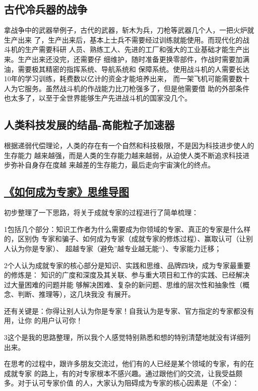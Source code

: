 \documentclass[11pt]{ctexart}
\begin{document}
{{{{\subsection{古代冷兵器的战争}
\label{sec:org8cf4dc8}
拿战争中的武器举例子，古代的武器，斩木为兵，刀枪等武器几个人，一把火炉就生产出来
了，生产出来后，基本上士兵不需要经过训练就能使用。而现代化的战斗机的生产需要科研
人员、熟练工人、先进的工厂和强大的工业基础才能生产出来。生产出来还没完，还需要仔
细维护，随时准备更换零部件，作战时需要加满油，需要极其精密的指挥系统、导航系统和
保障系统。使用战斗机的人需要长达10年的学习训练，耗费数以亿计的资金才能培养出来，
而一架飞机可能需要数十人为它服务。虽然战斗机的作战能力比刀枪强多了，但是他需要借
助的外部条件也太多了，以至于全世界能够生产先进战斗机的国家没几个。

\subsection{人类科技发展的结晶-高能粒子加速器}
\label{sec:org35abfa5}

根据递弱代偿理论，人类的存在有一个自然和科技极限，不是因为科技进步使人的生存能力
越来越强，而是人类的生存能力越来越弱，从迫使人类不断追求科技进步弥补自身存在度越
来越差的生存能力，最后走向宇宙演化的终点。
\subsection{\href{http://www.jianshu.com/p/f84f4f9f9313}{《如何成为专家》思维导图}}
\label{sec:orgb202acc}

初步整理了一下思路，将关于成就专家的过程进行了简单梳理：

1包括几个部分：知识工作者为什么需要成为你领域的专家、真正的专家是什么样的，区别伪
专家和骗子、如何成为专家（成就专家的修炼过程）、赢取认可（让别人认为你是专家）、
超越专家（避免”越专业越无能“）、专家能力迁移；

2个人认为成就专家的核心部分是知识、实践和思维、品牌四块，成为专家最重要的修炼是：
知识的广度和深度及其关联、参与重大项目和工作的实践、已经解决过大量困难的问题并能
够解决困难、复杂的新问题、思维的层次性和抽象性（概念、判断、推理等），这几块我没
有展开。

还有关键是：你得让别人认为你是专家！自我认为是专家、官方指定的专家都没有用，让你
的用户认可你！

3这个是我的思路整理，所以我个人感觉特别熟悉和想的特别清楚地就没有详细列出来。

在思考的过程中，跟许多朋友交流过，他们有的人已经是某个领域的专家，有的在成就专家
的路上，有的对专家根本不感兴趣。通过跟他们的交流，让我受益颇多。对于认可专家价值
的人，大家认为阻碍成为专家的核心因素是（不全）：

}}}}
\end{document}
